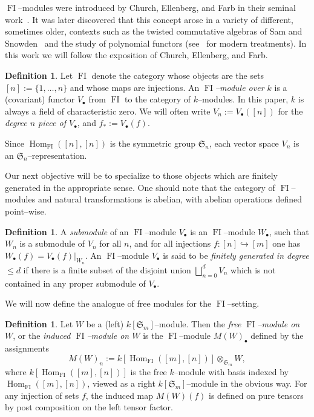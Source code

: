 \documentclass[10pt]{amsart}
\DeclareMathOperator{\FI}{FI}
\DeclareMathOperator{\Hom}{Hom}
\newcommand{\Sn}{\mathfrak{S}}
\newcommand{\as}{\text{*}}
\newcommand{\dt}{\bullet}
\theoremstyle{definition}
\newtheorem{definition}[theorem]{Definition}
\begin{document}
$\FI$--modules were introduced by Church, Ellenberg, and Farb in their seminal work~\cite{CEF}. It was later discovered that this concept arose in a variety of different, sometimes older, contexts such as the twisted commutative algebras of Sam and Snowden~\cite{SS} and the study of polynomial functors (see~\cite{D,DV} for modern treatments). In this work we will follow the exposition of Church, Ellenberg, and Farb.

\begin{definition}
Let $\FI$ denote the category whose objects are the sets $[n] := \{1,\ldots,n\}$ and whose maps are injections. An \emph{$\FI$--module over $k$} is a (covariant) functor $V_\dt$ from $\FI$ to the category of $k$--modules. In this paper, $k$ is always a field of characteristic zero. We will often write $V_n := V_\dt([n])$ for the \emph{degree $n$ piece of $V_\dt$}, and $f_\as := V_\dt(f)$.
\end{definition}

Since $\Hom_{\FI}([n], [n])$ is the symmetric group $\Sn_n$, each vector space $V_n$ is an $\Sn_n$--representation.

Our next objective will be to specialize to those objects which are finitely generated in the appropriate sense. One should note that the category of $\FI$--modules and natural transformations is abelian, with abelian operations defined point--wise.

\begin{definition}\label{finitelygenerated}
A \emph{submodule} of an $\FI$--module $V_\dt$ is an $\FI$--module $W_\dt$, such that $W_n$ is a submodule of $V_n$ for all $n$, and for all injections $f:[n] \hookrightarrow [m]$ one has $W_\dt(f) = V_\dt(f)|_{W_n}$. An $\FI$--module $V_{\dt}$ is said to be \emph{finitely generated in degree $\leq d$} if there is a finite subset of the disjoint union $\bigsqcup_{n = 0}^d V_n$ which is not contained in any proper submodule of $V_{\dt}$.
\end{definition}

We will now define the analogue of free modules for the $\FI$--setting.

\begin{definition}
Let $W$ be a (left) $k[\Sn_m]$--module. Then the \emph{free $\FI$--module on $W$}, or the \emph{induced $\FI$--module on $W$} is the $\FI$--module $M(W)_\dt$ defined by the assignments
\[
M(W)_n := k[\Hom_{\FI}([m],[n])] \otimes_{\Sn_m} W,
\]
where $k[\Hom_{\FI}([m],[n])]$ is the free $k$--module with basis indexed by $\Hom_{\FI}([m],[n])$, viewed as a right $k[\Sn_m]$--module in the obvious way. For any injection of sets $f$, the induced map $M(W)(f)$ is defined on pure tensors by post composition on the left tensor factor.
\end{definition}
\end{document}
